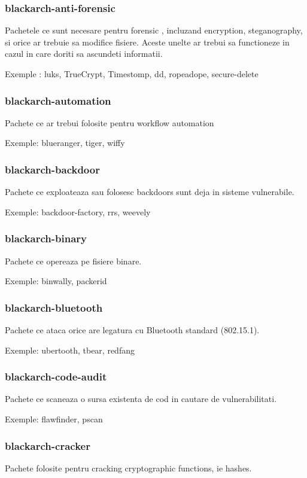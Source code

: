 \documentclass[a4paper, oneside, 11pt]{book}
\begin{document}
\subsubsection{blackarch-anti-forensic}
Pachetele ce sunt necesare pentru forensic ,
incluzand encryption, steganography, si orice  ar trebuie sa modifice fisiere.
Aceste unelte ar trebui sa functioneze in cazul in care doriti sa ascundeti informatii.

Exemple : luks, TrueCrypt, Timestomp, dd, ropeadope, secure-delete

\subsubsection{blackarch-automation}
Pachete ce ar trebui folosite pentru workflow automation

Exemple: blueranger, tiger, wiffy

\subsubsection{blackarch-backdoor}
Pachete ce  exploateaza sau folosesc backdoors sunt  deja  in sisteme vulnerabile.

Exemple: backdoor-factory, rrs, weevely

\subsubsection{blackarch-binary}
Pachete ce opereaza pe fisiere binare.

Exemple: binwally, packerid

\subsubsection{blackarch-bluetooth}
Pachete ce ataca orice are legatura cu Bluetooth standard (802.15.1).

Exemple: ubertooth, tbear, redfang

\subsubsection{blackarch-code-audit}
Pachete ce  scaneaza o sursa existenta de cod in cautare de vulnerabilitati.

Exemple: flawfinder, pscan

\subsubsection{blackarch-cracker}
Pachete folosite pentru cracking cryptographic functions, ie hashes.
\end{document}
